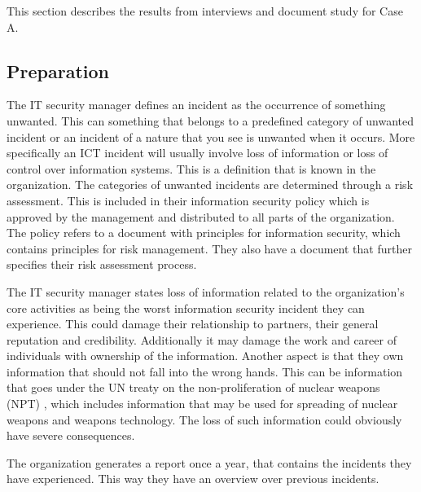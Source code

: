 This section describes the results from interviews and document study for Case A. 

\subsection{Preparation}
The IT security manager defines an incident %
as the occurrence of something unwanted. This can something that belongs to a predefined category of unwanted incident or an incident of a nature that you see is unwanted when it occurs. More specifically an \ac{ICT} incident will usually involve loss of information or loss of control over information systems. This is a definition that is known in the organization. The categories of unwanted incidents are determined through a risk assessment. This is included in their information security policy which is approved by the management and distributed to all parts of the organization. The policy refers to a document with principles for information security, which contains principles for risk management. They also have a document that further specifies their risk assessment process. %

The IT security manager states loss of information related to the organization's core activities as being the worst information security incident they can experience. This could damage their relationship to partners, their general reputation and credibility. Additionally it may damage the work and career of individuals with ownership of the information. %
Another aspect is that they own information that should not fall into the wrong hands. This can be information that goes under the \ac{UN} treaty on the non-proliferation of nuclear weapons (NPT) \cite{NPT}, which includes information that may be used for spreading of nuclear weapons and weapons technology. %
The loss of such information could obviously have severe consequences.

The organization generates a report once a year, that contains the incidents they have experienced. This way they have an overview over previous incidents.

